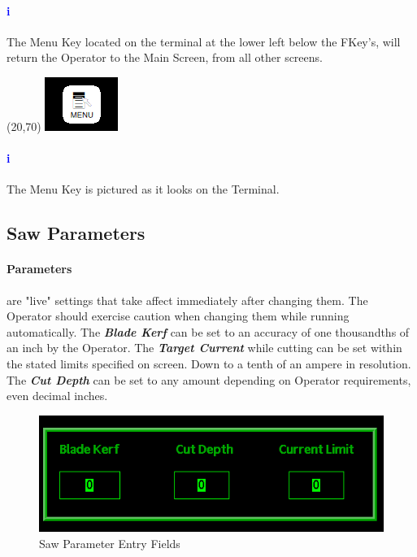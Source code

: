 \paragraph{\textbf{\LARGE \textcolor{blue}{i}}}
The Menu Key located on the terminal at the lower left below the FKey's, will return the Operator to the Main Screen, from all other screens.\\
\begin{minipage}{4cm}
	\begin{picture}(20,70)
		\includegraphics[width=.5\linewidth]{screen-captures/menu}
	\end{picture}
\end{minipage}\begin{minipage}[]{11cm}
	\paragraph{\textbf{\LARGE \textcolor{blue}{i}}} The Menu Key is pictured as it looks on the Terminal.
\end{minipage}
\pagebreak
\subsection{Saw Parameters}\paragraph*{Parameters}are "live" settings that take affect immediately after changing them. The Operator should exercise caution when changing them while running automatically. The \textbf{\textit{Blade Kerf}} can be set to an accuracy of one thousandths of an inch by the Operator. The \textbf{\textit{Target Current}} while cutting can be set within the stated limits specified on screen. Down to a tenth of an ampere in resolution. The \textbf{\textit{Cut Depth}} can be set to any amount depending on Operator requirements, even decimal inches.
\begin{figure}
	\centering
	\includegraphics[width=.2\linewidth]{screen-captures/program/pgm-saw-info-entry}
	\caption{Saw Parameter Entry Fields}
	\label{fig:pgm-saw-info-entry}
\end{figure}
